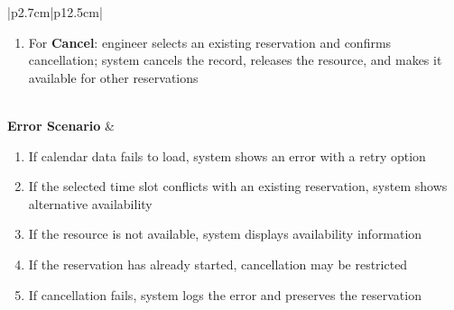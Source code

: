 \begin{table}[H]
\begin{tabular}{|p{2.7cm}|p{12.5cm}|}
\begin{minipage}[t]{\linewidth}
\begin{enumerate}[topsep=0pt,itemsep=1pt,parsep=0pt,partopsep=0pt]
                                                    approval status
                                              \item For \textbf{Cancel}: engineer selects an existing reservation and confirms
                                                    cancellation; system cancels the record, releases the resource, and makes it
                                                    available for other reservations
                                          \end{enumerate}
                                      \end{minipage}                                                                     \\
            \hline
            \textbf{Error Scenario} & \begin{minipage}[t]{\linewidth}
                                          \begin{enumerate}[topsep=0pt,itemsep=1pt,parsep=0pt,partopsep=0pt]
                                              \item If calendar data fails to load, system shows an error with a retry option
                                              \item If the selected time slot conflicts with an existing reservation, system shows
                                                    alternative availability
                                              \item If the resource is not available, system displays availability information
                                              \item If the reservation has already started, cancellation may be restricted
                                              \item If cancellation fails, system logs the error and preserves the reservation
                                          \end{enumerate}
                                      \end{minipage}                                                                      \\
            \hline
        \end{tabular}
        \label{tab:eng-reservation-lifecycle}
    \end{table}

